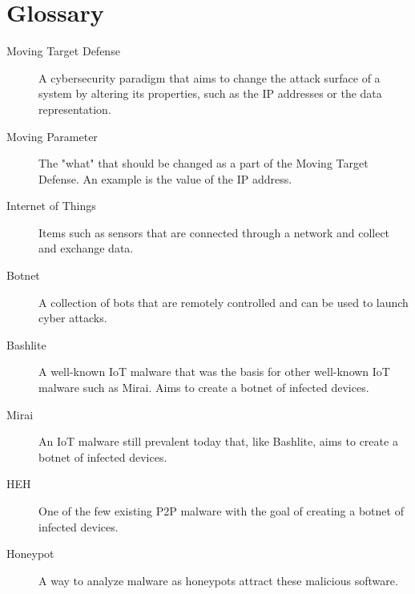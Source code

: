\chapter*{Glossary}


\begin{description}
  \item[Moving Target Defense] A cybersecurity paradigm that aims to change the attack surface of a system by altering its properties, such as the IP addresses or the data representation.
  \item[Moving Parameter] The "what" that should be changed as a part of the Moving Target Defense. An example is the value of the IP address. 
  \item[Internet of Things] Items such as sensors that are connected through a network and collect and exchange data.
  \item[Botnet] A collection of bots that are remotely controlled and can be used to launch cyber attacks.
  \item[Bashlite] A well-known IoT malware that was the basis for other well-known IoT malware such as Mirai. Aims to create a botnet of infected devices.
  \item[Mirai] An IoT malware still prevalent today that, like Bashlite, aims to create a botnet of infected devices.
  \item[HEH] One of the few existing P2P malware with the goal of creating a botnet of infected devices.    
  \item[Honeypot] A way to analyze malware as honeypots attract these malicious software.
\end{description}
